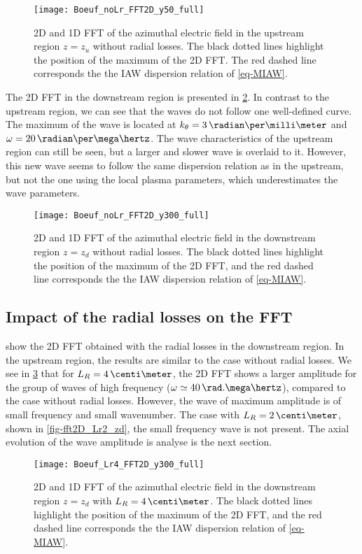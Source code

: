 \begin{figure}[hbtp]
  \centering
  \texttt{[image: Boeuf\_noLr\_FFT2D\_y50\_full]}
  \caption{\ac{2D} and \ac{1D} \ac{FFT} of the azimuthal electric field in the upstream region $z=z_u$ without radial losses. The black dotted lines highlight the position of the maximum of the \ac{2D} \ac{FFT}. The red dashed line corresponds the the \ac{IAW} dispersion relation of \cref{eq-MIAW}.}
  \label{fig-fft2D_noLr_zu}
\end{figure}

The \ac{2D} \ac{FFT} in the downstream region is presented in \cref{fig-fft2D_noLr_zd}.
In contrast to the upstream region, we can see that the waves do not follow one well-defined curve.
The maximum of the wave is located at $k_{\theta} = 3\,\radian\per\milli\meter$ and $\omega = 20\, \radian\per\mega\hertz$.
The wave characteristics of the upstream region can still be seen, but a larger and slower wave is overlaid to it.
However, this new wave seems to follow the same dispersion relation as in the upstream, but not the one using the local plasma parameters, which underestimates the wave parameters.


\begin{figure}[hbtp]
  \centering
  \texttt{[image: Boeuf\_noLr\_FFT2D\_y300\_full]}
  \caption{\ac{2D} and \ac{1D} \ac{FFT} of the azimuthal electric field in the downstream region $z=z_d$ without radial losses.  The black dotted lines highlight the position of the maximum of the \ac{2D} \ac{FFT}, and the red dashed line corresponds the the \ac{IAW} dispersion relation of \cref{eq-MIAW}.}
  \label{fig-fft2D_noLr_zd}
\end{figure}

\subsection{Impact of the radial losses on the \ac{FFT}} \label{subsec-fft_losses}

 show the \ac{2D} \ac{FFT} obtained with the radial losses in the downstream region.
In the upstream region, the results are similar to the case without radial losses.
We see in \cref{fig-fft2D_Lr4_zd} that for $L_R=4\,\centi\meter$, the \ac{2D} \ac{FFT} shows a larger amplitude for the group of waves of high frequency ($\omega \simeq 40 \,\rad.\mega\hertz$), compared to the case without radial losses.
However, the wave of maximum amplitude is of small frequency and small wavenumber.
The case with $L_R=2\,\centi\meter$, shown in \cref{fig-fft2D_Lr2_zd}, the small frequency wave is not present.
The axial evolution of the wave amplitude is analyse is the next section. 
\begin{figure}[hbtp]
  \centering
  \texttt{[image: Boeuf\_Lr4\_FFT2D\_y300\_full]}
  \caption{\ac{2D} and \ac{1D} \ac{FFT} of the azimuthal electric field in the downstream region $z=z_d$ with $L_R=4\,\centi\meter$.  The black dotted lines highlight the position of the maximum of the \ac{2D} \ac{FFT}, and the red dashed line corresponds the the \ac{IAW} dispersion relation of \cref{eq-MIAW}.}
  \label{fig-fft2D_Lr4_zd}
\end{figure}



